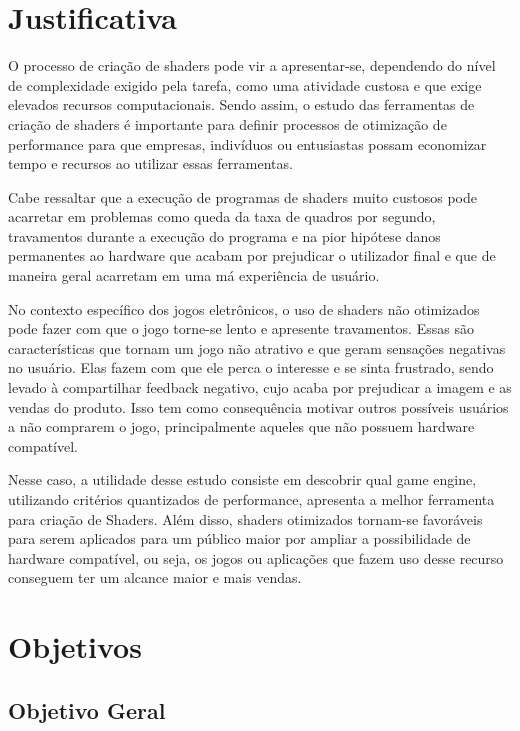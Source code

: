 \section{Justificativa}
\label{sec:justificativa}

O processo de criação de shaders pode vir a apresentar-se, dependendo do nível de complexidade exigido pela tarefa, como uma atividade custosa e que exige elevados recursos computacionais. Sendo assim, o estudo das ferramentas de criação de shaders é importante para definir processos de otimização de performance para que empresas, indivíduos ou entusiastas possam economizar tempo e recursos ao utilizar essas ferramentas. 

Cabe ressaltar que a execução de programas de shaders muito custosos pode acarretar em problemas como queda da taxa de quadros por segundo, travamentos durante a execução do programa e na pior hipótese danos permanentes ao hardware que acabam por prejudicar o utilizador final e que de maneira geral acarretam em uma má experiência de usuário. 

No contexto específico dos jogos eletrônicos, o uso de shaders não otimizados pode fazer com que o jogo torne-se lento e apresente travamentos. Essas são características que tornam um jogo não atrativo e que geram sensações negativas no usuário. Elas fazem com que ele perca o interesse e se sinta frustrado, sendo levado à compartilhar feedback negativo, cujo acaba por prejudicar a imagem e as vendas do produto. Isso tem como consequência motivar outros possíveis usuários a não comprarem o jogo, principalmente aqueles que não possuem hardware compatível.

Nesse caso, a utilidade desse estudo consiste em descobrir qual game engine, utilizando critérios quantizados de performance, apresenta a melhor ferramenta para criação de Shaders. Além disso, shaders otimizados tornam-se favoráveis para serem aplicados para um público maior por ampliar a possibilidade de hardware compatível, ou seja, os jogos ou aplicações que fazem uso desse recurso conseguem ter um alcance maior e mais vendas.

\section{Objetivos}
\label{sec:objetivos}

\subsection{Objetivo Geral}
\label{sec:objetivo-geral}

